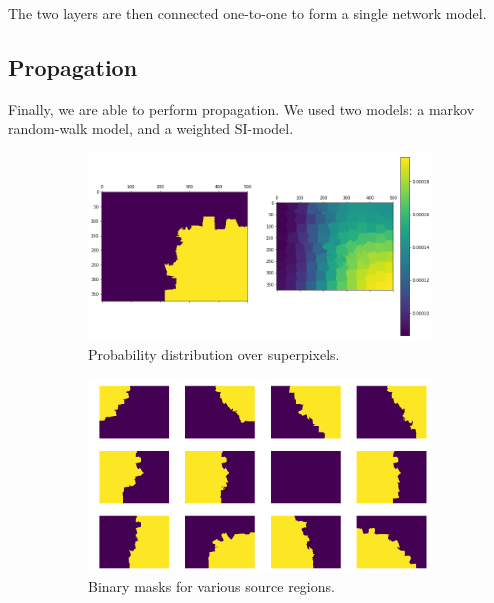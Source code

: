 \documentclass[twocolumn]{article}
\begin{document}
The two layers are then connected one-to-one to form a single network model.

\subsection{Propagation}

Finally, we are able to perform propagation. We used two models: a markov random-walk model, and a weighted SI-model.


\begin{figure}[t]
  \centering

  \begin{subfigure}{0.49\linewidth}
    \includegraphics[width=\linewidth]{figs/single_source.png}
    \caption{Probability distribution over superpixels.}
  \end{subfigure}
  \begin{subfigure}{0.49\linewidth}
    \includegraphics[width=\linewidth]{figs/many_sources.png}
    \caption{Binary masks for various source regions.}
  \end{subfigure}
  \begin{subfigure}{0.49\linewidth}

\end{subfigure}
\end{figure}
\end{document}
